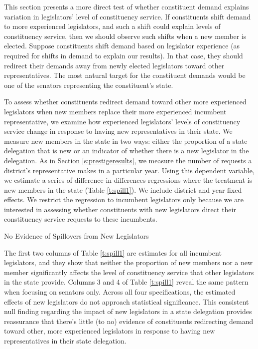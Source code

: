 \documentclass[12pt]{article}
\begin{document}
This section presents a more direct test of whether constituent demand explains variation in legislators' level of constituency service. If constituents shift demand to more experienced legislators, and such a shift could explain levels of constituency service, then we should observe such shifts when a new member is elected. Suppose constituents shift demand based on legislator experience (as required for shifts in demand to explain our results). In that case, they should redirect their demands away from newly elected legislators toward other representatives. The most natural target for the constituent demands would be one of the senators representing the constituent's state.

To assess whether constituents redirect demand toward other more experienced legislators when new members replace their more experienced incumbent representative, we examine how experienced legislators' levels of constituency service change in response to having new representatives in their state. We measure new members in the state in two ways: either the proportion of a state delegation that is new or an indicator of whether there is a new legislator in the delegation. As in Section \ref{s:prestigeresults}, we measure the number of requests a district's representative makes in a particular year. Using this dependent variable, we estimate a series of difference-in-differences regressions where the treatment is new members in the state (Table \ref{t:spill1}). We include district and year fixed effects. We restrict the regression to incumbent legislators only because we are interested in assessing whether constituents with new legislators direct their constituency service requests to these incumbents. 
   
\begin{table}[hbt!]
\caption{No Evidence of Spillovers from New Legislators} \label{t:spill1}

\begin{minipage}{\textwidth}
\begin{center}

\end{center}
\end{minipage}
\end{table}

The first two columns of Table \ref{t:spill1} are estimates for all incumbent legislators, and they show that neither the proportion of new members nor a new member significantly affects the level of constituency service that other legislators in the state provide. Columns 3 and 4 of Table \ref{t:spill1} reveal the same pattern when focusing on senators only. Across all four specifications, the estimated effects of new legislators do not approach statistical significance.  This consistent null finding regarding the impact of new legislators in a state delegation provides reassurance that there's little (to no) evidence of constituents redirecting demand toward other, more experienced legislators in response to having new representatives in their state delegation. %
\end{document}
